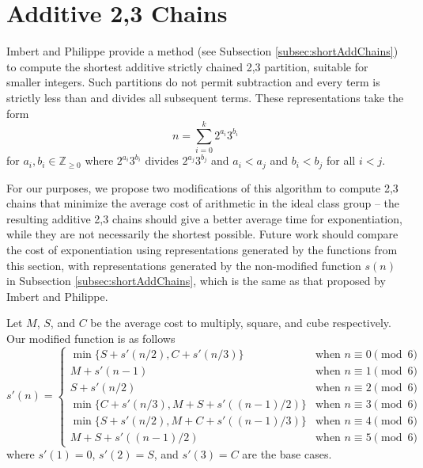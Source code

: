 \documentclass{ucalgthes1}
\theoremstyle{definition}
\newcommand{\ZZgez}{\mathbb{Z}_{\ge 0}}
\begin{document}
\section{Additive 2,3 Chains}
\label{sec:expAddChains}

Imbert and Philippe \cite[\S 3]{Imbert2010b} provide a method (see Subsection \ref{subsec:shortAddChains}) to compute the shortest additive strictly chained 2,3 partition, suitable for smaller integers.  Such partitions do not permit subtraction and every term is strictly less than and divides all subsequent terms. These representations take the form
\[
	n = \sum_{i=0}^k 2^{a_i}3^{b_i}
\]
for $a_i, b_i \in \ZZgez$ where $2^{a_i}3^{b_i}$ divides $2^{a_j}3^{b_j}$ and $a_i < a_j$ and $b_i < b_j$ for all $i < j$.

For our purposes, we propose two modifications of this algorithm to compute 2,3 chains that minimize the average cost of arithmetic in the ideal class group -- the resulting additive 2,3 chains should give a better average time for exponentiation, while they are not necessarily the shortest possible.  Future work should compare the cost of exponentiation using representations generated by the functions from this section, with representations generated by the non-modified function $s(n)$ in Subsection \ref{subsec:shortAddChains}, which is the same as that proposed by Imbert and Philippe.

Let $M$, $S$, and $C$ be the average cost to multiply, square, and cube respectively. Our modified function is as follows
\begin{equation*}
s'(n) = \begin{cases}
	\min\{S + s'(n/2), C + s'(n/3)\} & \textrm{when } n \equiv 0 \pmod 6 \\
	M + s'(n-1) & \textrm{when } n \equiv 1 \pmod 6 \\
	S + s'(n/2) & \textrm{when } n \equiv 2 \pmod 6 \\
	\min\{C + s'(n/3), M + S + s'((n-1)/2)\} & \textrm{when } n \equiv 3 \pmod 6 \\
	\min\{S + s'(n/2), M + C + s'((n-1)/3)\} & \textrm{when } n \equiv 4 \pmod 6 \\
	M + S + s'((n-1)/2) & \textrm{when } n \equiv 5 \pmod 6
\end{cases}
\end{equation*}
where $s'(1) = 0$, $s'(2) = S$, and $s'(3) = C$ are the base cases.
\end{document}
